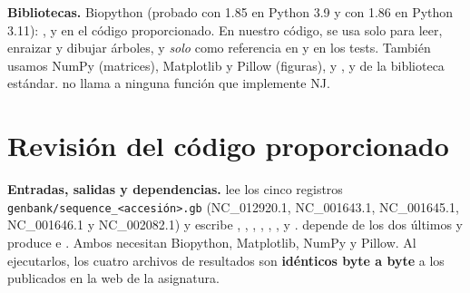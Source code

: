 \documentclass[10pt,a4paper]{article}
\begin{document}
\textbf{Bibliotecas.} Biopython (probado con 1.85 en Python 3.9 y con 1.86 en Python 3.11): ,  y  en el código proporcionado. En nuestro código,  se usa solo para leer, enraizar y dibujar árboles, y  \emph{solo} como referencia en  y en los tests. También usamos NumPy (matrices), Matplotlib y Pillow (figuras), y ,  y  de la biblioteca estándar.  no llama a ninguna función que implemente NJ.

\section{Revisión del código proporcionado}

\textbf{Entradas, salidas y dependencias.}  lee los cinco registros \texttt{genbank/\allowbreak sequence\_\allowbreak<accesión>.gb} (NC\_012920.1, NC\_001643.1, NC\_001645.1, NC\_001646.1 y NC\_002082.1) y escribe , , , , , ,  y .  depende de los dos últimos y produce  e . Ambos necesitan Biopython, Matplotlib, NumPy y Pillow. Al ejecutarlos, los cuatro archivos de resultados son \textbf{idénticos byte a byte} a los publicados en la web de la asignatura.
\end{document}
